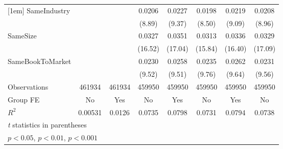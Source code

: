 {\begin{tabular}{l*{7}{c}}
[1em]
SameIndustry    &                  &                  &   0.0206\sym{***}&   0.0227\sym{***}&   0.0198\sym{***}&   0.0219\sym{***}&   0.0208\sym{***}\\
                &                  &                  &   (8.89)         &   (9.37)         &   (8.50)         &   (9.09)         &   (8.96)         \\
[1em]
SameSize        &                  &                  &   0.0327\sym{***}&   0.0351\sym{***}&   0.0313\sym{***}&   0.0336\sym{***}&   0.0329\sym{***}\\
                &                  &                  &  (16.52)         &  (17.04)         &  (15.84)         &  (16.40)         &  (17.09)         \\
[1em]
SameBookToMarket&                  &                  &   0.0230\sym{***}&   0.0258\sym{***}&   0.0235\sym{***}&   0.0262\sym{***}&   0.0231\sym{***}\\
                &                  &                  &   (9.52)         &   (9.51)         &   (9.76)         &   (9.64)         &   (9.56)         \\
\hline
Observations    &   461934         &   461934         &   459950         &   459950         &   459950         &   459950         &   459950         \\
Group FE        &       No         &      Yes         &       No         &      Yes         &       No         &      Yes         &       No         \\
$ R^2 $         &  0.00531         &   0.0126         &   0.0735         &   0.0798         &   0.0731         &   0.0794         &   0.0738         \\
\hline\hline
\multicolumn{8}{l}{\footnotesize \textit{t} statistics in parentheses}\\
\multicolumn{8}{l}{\footnotesize \sym{*} \(p<0.05\), \sym{**} \(p<0.01\), \sym{***} \(p<0.001\)}\\
\end{tabular}
}
